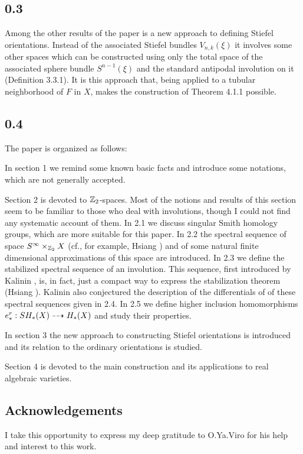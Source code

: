 \documentclass{article}
\begin{document}
\subsection*{ 0.3 }
Among the other results of the paper is a new approach to defining
Stiefel orientations. Instead of the associated Stiefel bundles
$V_{n,k}(\xi)$ it involves some other spaces which can be constructed
using only the total space of the associated sphere bundle $S^{n-1}(\xi)$
and the standard antipodal involution on it (Definition 3.3.1). It is this 
approach that, being applied to a tubular neighborhood of $F$ in $X$,
makes the construction of Theorem 4.1.1 possible.
\subsection*{ 0.4 }
The paper is organized as follows:

In section 1 we remind some known basic facts and introduce some notations,
which are not generally accepted.

Section 2 is devoted to $\mathbb Z_2$-spaces. Most of the notions and results of
this section seem to be familiar to those who deal with involutions,
though I could not find any systematic account of them. In 2.1 we discuss
singular Smith homology groups, which are more suitable for this paper.
In 2.2 the spectral sequence of space $S^\infty\times_{\mathbb Z_2} X$ (cf., for example,
Hsiang \cite{4}) and of some natural finite dimensional approximations of
this space are introduced. In 2.3 we define the stabilized spectral 
sequence of an involution. This sequence, first introduced by
Kalinin \cite{5}, is, in fact, just a compact way to express the
stabilization theorem (Hsiang \cite{4}). Kalinin also conjectured
the description of the differentials of of these spectral sequences
given in 2.4. In 2.5 we define higher inclusion homomorphisms
$e_*^r:SH_*(X)\dashrightarrow H_*(X)$ and study their properties.

In section 3 the new approach to constructing Stiefel orientations
is introduced and its relation to the ordinary orientations is studied.

Section 4 is devoted to the main construction and its applications to
real algebraic varieties.
\subsection*{Acknowledgements }
I take this opportunity to express my deep gratitude to O.Ya.Viro
for his help and interest to this work.
\end{document}
